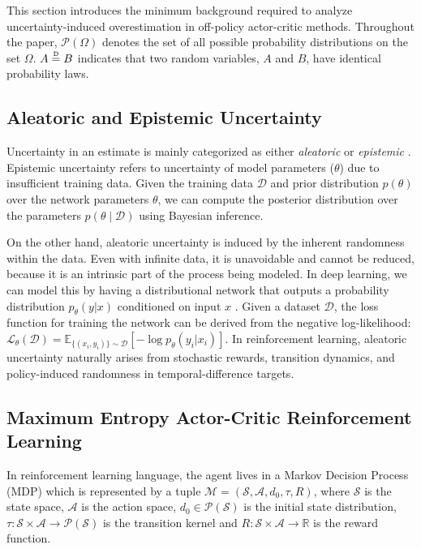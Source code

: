 \documentclass{article}
\newcommand\disteq{\mathrel{\stackrel{\makebox[0pt]{\mbox{\normalfont\tiny D}}}{=}}}
\begin{document}
\label{sec:preliminaries}

This section introduces the minimum background required to analyze uncertainty-induced overestimation in off-policy actor-critic methods. Throughout the paper, $\mathcal{P}(\Omega)$ denotes the set of all possible probability distributions on the set $\Omega$. $A \disteq B $ indicates that two random variables, $A$ and $B$, have identical probability laws. 

\subsection{Aleatoric and Epistemic Uncertainty}

Uncertainty in an estimate is mainly categorized as either \textit{aleatoric} or \textit{epistemic}  \citep{der2009aleatory, kendall2017uncertainties, gal2016uncertainty}. Epistemic uncertainty refers to uncertainty of model parameters ($\theta$) due to insufficient training data. Given the training data $\mathcal{D}$ and prior distribution $p(\theta)$ over the network parameters $\theta$, we can compute the posterior distribution over the parameters $p(\theta \mid \mathcal{D})$ using Bayesian inference. 

On the other hand, aleatoric uncertainty is induced by the inherent randomness within the data. Even with infinite data, it is unavoidable and cannot be reduced, because it is an intrinsic part of the process being modeled. In deep learning, we can model this by having a distributional network that outputs a probability distribution $p_{\theta}(y|x)$ conditioned on input $x$ \citep{lakshminarayanan2017simple, kendall2017uncertainties}. Given a dataset $\mathcal{D}$, the loss function for training the network can be derived from the negative log-likelihood: $\mathcal{L}_{\theta}(\mathcal{D}) = \mathbb{E}_{\{(x_i, y_i)\} \sim \mathcal{D}} [ -\log{p_{\theta}(y_i|x_i)} ] $. In reinforcement learning, aleatoric uncertainty naturally arises from stochastic rewards, transition dynamics, and policy-induced randomness in temporal-difference targets. 

\subsection{Maximum Entropy Actor-Critic Reinforcement Learning}

In reinforcement learning language, the agent lives in a Markov Decision Process (MDP) which is represented by a tuple $\mathcal{M} = (\mathcal{S}, \mathcal{A}, d_0, \tau, R)$, where $\mathcal{S}$ is the state space, $\mathcal{A}$ is the action space, $d_0 \in \mathcal{P}(\mathcal{S})$ is the initial state distribution, $\tau: \mathcal{S}\times\mathcal{A} \rightarrow \mathcal{P}(\mathcal{S})$ is the transition kernel and $R: \mathcal{S}\times\mathcal{A} \rightarrow \mathbb{R}$ is the reward function. 
\end{document}
